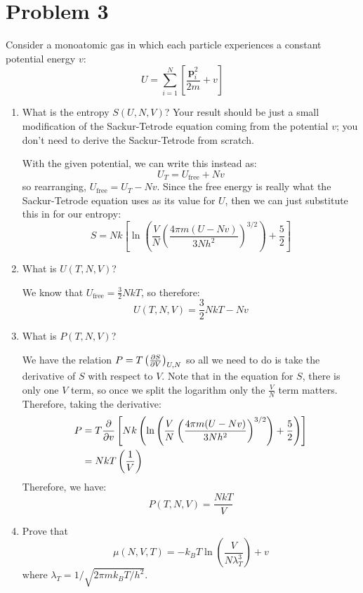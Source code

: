 \documentclass[10pt]{article}
\begin{document}
	\section*{Problem 3}
	Consider a monoatomic gas in which each particle experiences a constant potential energy $v$:
	\[
		U = \sum_{i = 1}^{N}\left[ \frac{\mathbf p_i^2}{2m} + v\right]
	\] 
	\begin{enumerate}[label=\alph*)]
		\item What is the entropy $S(U, N, V)$? Your result should be just a small modification of the 
			Sackur-Tetrode equation coming from the potential $v$; you don't need to derive the Sackur-Tetrode
			from scratch.

			\begin{solution}

				With the given potential, we can write this instead as:
				\[
					U_T = U_{\text{free}} + Nv
				\] 
				so rearranging, $U_{\text{free}} = U_T - Nv$. Since the free energy is really what the 
				Sackur-Tetrode equation uses as its value for $U$, then we can just substitute 
				this in for our entropy:
				\[
					S = Nk\left[ \ln\left( \frac{V}{N}\left( \frac{4 \pi m(U - Nv)}{3Nh^2} \right)^{3 / 2}\right) + \frac{5}{2} \right] 
				\] 
			\end{solution}
		\item What is $U(T, N, V)$?

			\begin{solution}
				We know that $U_{\text{free}} = \frac{3}{2}NkT$, so therefore:
				\[
				U(T, N, V) = \frac{3}{2}NkT - Nv
				\] 
			\end{solution}
		\item What is $P(T, N, V)$?

			\begin{solution}
				We have the relation $P = T\left( \pdv{S}{V} \right)_{U, N}$ so all we need to do 
				is take the derivative of $S$ with respect to $V$. Note that in the equation for $S$, there is 
				only one $V$ term, so once we split the logarithm only the $\frac{V}{N}$ term matters.
				Therefore, taking the derivative:
				\begin{align*}
					P &= T \pdv{v} \left[ Nk\left( \ln \left( 
					\frac{V}{N}\left( \frac{4 \pi m(U - Nv)}{3Nh^2} \right)^{3 / 2} \right) +
			\frac{5}{2} \right)  \right] \\
			&= NkT\left( \frac{1}{V} \right)
			\end{align*}
			Therefore, we have:  
			\[
				P(T, N, V) = \frac{NkT}{V}	
			\] 
			\end{solution}
		\item Prove that 
			\[
			\mu(N, V, T) = -k_B T \ln\left( \frac{V}{N \lambda_T^3} \right) + v
			\] 
			where $\lambda_T = 1 / \sqrt{2\pi m k_BT / h^2}$.


\end{enumerate}
\end{document}
